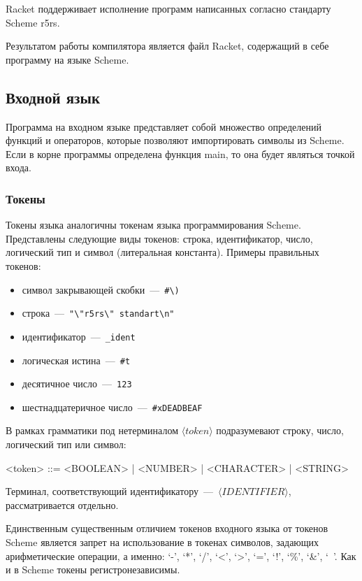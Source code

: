 \documentclass[12pt,a4paper,oneside]{extarticle}
\begin{document}
        Racket поддерживает исполнение программ написанных согласно стандарту Scheme r5rs.

        Результатом работы компилятора является файл Racket, содержащий в себе программу на языке Scheme.
    \clearpage

    \subsection{Входной язык}
        Программа на входном языке представляет собой множество определений функций и операторов, которые позволяют импортировать символы из Scheme.
        Если в корне программы определена функция main, то она будет являться точкой входа.

        \subsubsection{Токены}
            Токены языка аналогичны токенам языка программирования Scheme.
            Представлены следующие виды токенов: строка, идентификатор, число, логический тип и символ (литеральная константа). Примеры правильных токенов: 

            \begin{itemize}
                \item символ закрывающей скобки~---~\lstinline$#\)$
                \item строка~---~\lstinline$"\"r5rs\" standart\n"$
                \item идентификатор~---~\lstinline$_ident$
                \item логическая истина~---~\lstinline$#t$
                \item десятичное число~---~\lstinline$123$
                \item шестнадцатеричное число~---~\lstinline$#xDEADBEAF$
            \end{itemize}

            В рамках грамматики под нетерминалом $\langle token\rangle$ подразумевают строку, число, логический тип или символ:
            \begin{grammar}
                <token> ::= <BOOLEAN> | <NUMBER> | <CHARACTER> | <STRING>
            \end{grammar}
            Терминал, соответствующий идентификатору~---~$\langle IDENTIFIER \rangle$, рассматривается отдельно.

            Единственным существенным отличием токенов входного языка от токенов Scheme является запрет на использование в токенах символов, задающих арифметические операции, а именно: `-', `*', `/', `<', `>', `=', `!', `\%', `\&', `~'. Как и в Scheme токены регистронезависимы.      
\end{document}
